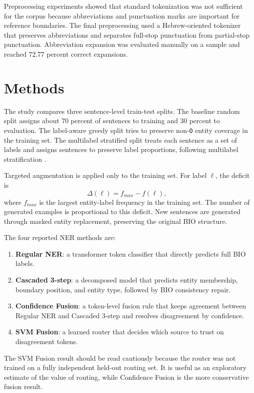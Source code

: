 \documentclass[11pt,a4paper]{article}
\begin{document}
Preprocessing experiments showed that standard tokenization was not sufficient for the corpus because abbreviations and punctuation marks are important for reference boundaries. The final preprocessing used a Hebrew-oriented tokenizer that preserves abbreviations and separates full-stop punctuation from partial-stop punctuation. Abbreviation expansion was evaluated manually on a sample and reached 72.77 percent correct expansions.

\section{Methods}
The study compares three sentence-level train-test splits. The baseline random split assigns about 70 percent of sentences to training and 30 percent to evaluation. The label-aware greedy split tries to preserve non-\texttt{O} entity coverage in the training set. The multilabel stratified split treats each sentence as a set of labels and assigns sentences to preserve label proportions, following multilabel stratification \citep{sechidis2011}.

Targeted augmentation is applied only to the training set. For label $\ell$, the deficit is
\[
\Delta(\ell)=f_{max}-f(\ell),
\]
where $f_{max}$ is the largest entity-label frequency in the training set. The number of generated examples is proportional to this deficit. New sentences are generated through masked entity replacement, preserving the original BIO structure.

The four reported NER methods are:
\begin{enumerate}[leftmargin=*]
\item \textbf{Regular NER}: a transformer token classifier that directly predicts full BIO labels.
\item \textbf{Cascaded 3-step}: a decomposed model that predicts entity membership, boundary position, and entity type, followed by BIO consistency repair.
\item \textbf{Confidence Fusion}: a token-level fusion rule that keeps agreement between Regular NER and Cascaded 3-step and resolves disagreement by confidence.
\item \textbf{SVM Fusion}: a learned router that decides which source to trust on disagreement tokens.
\end{enumerate}

The SVM Fusion result should be read cautiously because the router was not trained on a fully independent held-out routing set. It is useful as an exploratory estimate of the value of routing, while Confidence Fusion is the more conservative fusion result.
\end{document}
